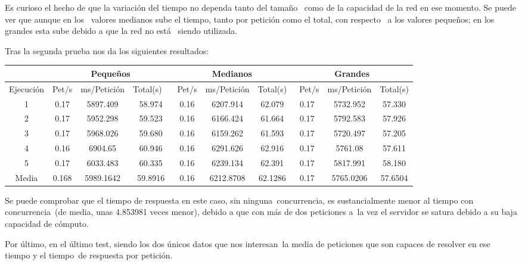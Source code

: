 \documentclass[11pt,twoside,a4paper]{book}
\begin{document}
Es curioso el hecho de que la variación del tiempo no dependa tanto del tamaño \
como de la capacidad de la red en ese momento. Se puede ver que aunque en los \
valores medianos sube el tiempo, tanto por petición como el total, con respecto \
a los valores pequeños; en los grandes esta sube debido a que la red no está \
siendo utilizada. \newline

Tras la segunda prueba nos da los siguientes resultados:

\begin{center}
\small
\begin{tabular}{ |c|c|c|c|c|c|c|c|c|c| }
 \hline
  & \multicolumn{3}{|c}{Pequeños} & \multicolumn{3}{|c|}{Medianos} & \multicolumn{3}{|c|}{Grandes} \\
 \hline
 Ejecución & Pet/s & ms/Petición & Total(s) \
 & Pet/s & ms/Petición & Total(s) &\
 Pet/s & ms/Petición & Total(s) \\
 \hline
 1 & 0.17 & 5897.409 & 58.974 & 0.16 & 6207.914 & 62.079 & 0.17 & 5732.952 & 57.330 \\
 \hline
 2 & 0.17 & 5952.298 & 59.523 & 0.16 & 6166.424 & 61.664 & 0.17 & 5792.583 & 57.926 \\
 \hline
 3 & 0.17 & 5968.026 & 59.680 & 0.16 & 6159.262 & 61.593 & 0.17 & 5720.497 & 57.205 \\
 \hline
 4 & 0.16 & 6904.65 & 60.946 & 0.16 & 6291.626 & 62.916 & 0.17 & 5761.08 & 57.611 \\
 \hline
 5 & 0.17 & 6033.483 & 60.335 & 0.16 & 6239.134 & 62.391 & 0.17 & 5817.991 & 58.180 \\
 \hline
 Media & 0.168 & 5989.1642 & 59.8916 & 0.16 & 6212.8708 & 62.1286 & 0.17 & 5765.0206 & 57.6504 \\
 \hline
\end{tabular}
\end{center}

Se puede comprobar que el tiempo de respuesta en este caso, sin ninguna\break\
concurrencia, es sustancialmente menor al tiempo con concurrencia\
(de media, unas 4.853981 veces menor), debido a que con más de dos peticiones a\
la vez el servidor se satura debido a su baja capacidad de cómputo. \newline

Por último, en el último test, siendo los dos únicos datos que nos interesan\
la media de peticiones que son capaces de resolver en ese tiempo y el tiempo\
de respuesta por petición.
\end{document}
